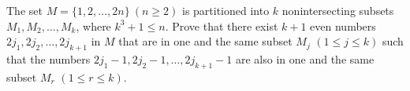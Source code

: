 The set $M=\{1,2,\ldots,2n\}~(n\ge2)$ is partitioned into $k$ nonintersecting subsets $M_1,M_2,\ldots,M_k$, where $k^3+1\le n$. Prove that there exist $k+1$ even numbers $2j_1,2j_2,\ldots,2j_{k+1}$ in $M$ that are in one and the same subset $M_j$ $(1\le j\le k)$ such that the numbers $2j_1-1,2j_2-1,\ldots,2j_{k+1}-1$ are also in one and the same subset $M_r$ $(1\le r\le k)$.